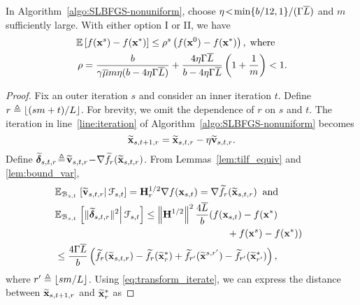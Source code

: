 \documentclass[10pt,twocolumn,journal]{IEEEtran}
\begin{document}
\begin{theorem}\label{thm:main}
In Algorithm~\ref{algo:SLBFGS-nonuniform}, choose $\eta\!<\!\min\{b/12,1\}/(\Gamma\overline{L})$ and $m$ sufficiently large. With either option I or II, we have 
\begin{align}
\mathbb{E} &\left[f(\mathbf{x}^s)-f(\mathbf{x}^*)\right] \le \rho^s\left(f(\mathbf{x}^0)-f(\mathbf{x}^*)\right),\;\mbox{where}\label{eq:linear_conv}\\
\rho& = \frac{b}{\gamma\overline{\mu} m\eta(b-4\eta\Gamma\overline{L})}+\frac{4\eta\Gamma\overline{L}}{b-4\eta\Gamma\overline{L}}\left(1+\frac{1}{m}\right) < 1. \label{eq:rho}
\end{align}
\end{theorem}
\begin{proof}
Fix an outer iteration $s$ and consider an inner iteration $t$. Define $r \triangleq \lfloor{(sm+t)/L}\rfloor$. For brevity, we omit   the dependence of $r$ on $s$ and $t$. The iteration in line~\ref{line:iteration} of Algorithm~\ref{algo:SLBFGS-nonuniform} 
  becomes
\begin{equation}
\widetilde{\mathbf{x}}_{s,t+1,r}  = \widetilde{\mathbf{x}}_{s,t,r} -\eta \widetilde{\mathbf{v}}_{s,t,r}. \label{eq:transform_iterate}
\end{equation}
Define \!$\widetilde{\bm{\delta}}_{s,t,r}\!\triangleq\! \widetilde{\mathbf{v}}_{s,t,r}\!-\!\nabla \widetilde{f}_r(\widetilde{\mathbf{x}}_{s,t,r})$. From Lemmas~\ref{lem:tilf_equiv} and \ref{lem:bound_var}, %
\begin{align}
&\hspace{-.2cm}\bbE_{\calB_{s,t}}\left.\left[\tilbv_{s,t,r}\right\vert\calF_{s,t}\right] = \bH_r^{1/2} \nabla f(\bx_{s,t}) = \nabla \tilf_r (\tilbx_{s,t,r})\;\;\mbox{and} \label{eq:exp_nabla_tilf}\\
&\hspace{-.2cm}\bbE_{\calB_{s,t}}\left.\left[\normt{\tbdelta_{s,t,r}}^2\right\vert\calF_{s,t}\right] \le \norm{\bH^{1/2}}^2\frac{4\barL}{b} (f(\bx_{s,t})-f(\bx^*)\nn\\
&\hspace{6cm}+f(\bx^s)-f(\bx^*))\nn\\
&\hspace{-.2cm}\le \frac{4\Gamma\barL}{b}\left(\tilf_r(\tilbx_{s,t,r})-\tilf_r(\tilbx_r^*)+\tilf_{r'}(\tilbx^{s,{r'}})-\tilf_{r'}(\tilbx_{r'}^*)\right),\label{eq:var_nabla_tilf}
\end{align}
where $r' \triangleq \lfloor{sm/L}\rfloor$. 
Using \eqref{eq:transform_iterate}, we can express the distance between $\widetilde{\mathbf{x}}_{s,t+1,r}$ and $\widetilde{\mathbf{x}}_r^*$ as

\end{proof}
\end{document}

